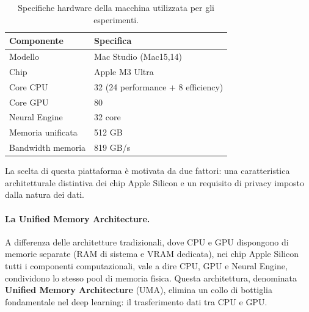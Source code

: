 \begin{table}[htbp]
    \centering
    \caption{Specifiche hardware della macchina utilizzata per gli esperimenti.}
    \label{tab:hardware_specs}
    \begin{tabular}{@{}ll@{}}
        \toprule
        \textbf{Componente} & \textbf{Specifica} \\
        \midrule
        Modello & Mac Studio (Mac15,14) \\
        Chip & Apple M3 Ultra \\
        Core CPU & 32 (24 performance + 8 efficiency) \\
        Core GPU & 80 \\
        Neural Engine & 32 core \\
        Memoria unificata & 512 GB \\
        Bandwidth memoria & 819 GB/s \\
        \bottomrule
    \end{tabular}
\end{table}

La scelta di questa piattaforma è motivata da due fattori: una caratteristica architetturale distintiva dei chip Apple Silicon e un requisito di privacy imposto dalla natura dei dati.

\paragraph{La Unified Memory Architecture.}
A differenza delle architetture tradizionali, dove CPU e GPU dispongono di memorie separate (RAM di sistema e VRAM dedicata), nei chip Apple Silicon tutti i componenti computazionali, vale a dire CPU, GPU e Neural Engine, condividono lo stesso pool di memoria fisica. Questa architettura, denominata \textbf{Unified Memory Architecture} (UMA), elimina un collo di bottiglia fondamentale nel deep learning: il trasferimento dati tra CPU e GPU.

